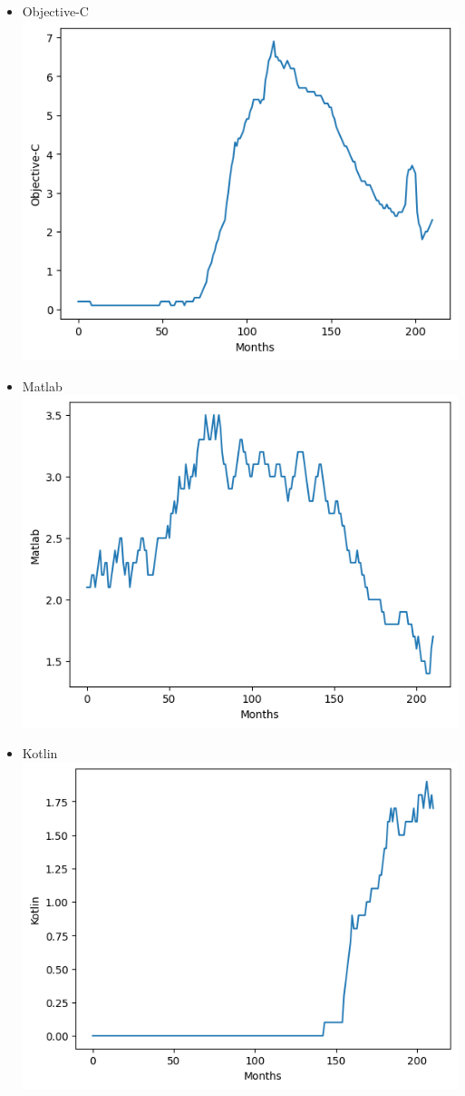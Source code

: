 \documentclass[conference]{IEEEtran}
\begin{document}
\begin{itemize}
\item{Objective-C}
\includegraphics[scale=0.4]{lineplot/objective-c.png}
\item{Matlab}
\includegraphics[scale=0.4]{lineplot/matlab.png}
\item{Kotlin}
\includegraphics[scale=0.4]{lineplot/kotlin.png}

\end{itemize}
\end{document}
